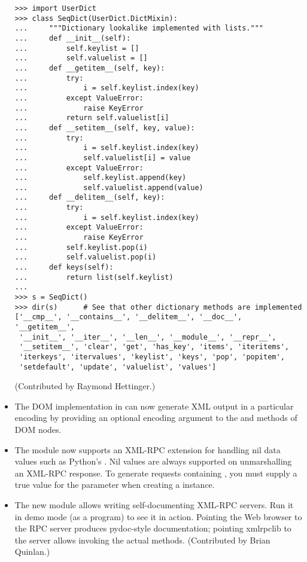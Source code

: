 \documentclass{howto}
\begin{document}
\begin{itemize}
\begin{verbatim}
>>> import UserDict
>>> class SeqDict(UserDict.DictMixin):
...     """Dictionary lookalike implemented with lists."""
...     def __init__(self):
...         self.keylist = []
...         self.valuelist = []
...     def __getitem__(self, key):
...         try:
...             i = self.keylist.index(key)
...         except ValueError:
...             raise KeyError
...         return self.valuelist[i]
...     def __setitem__(self, key, value):
...         try:
...             i = self.keylist.index(key)
...             self.valuelist[i] = value
...         except ValueError:
...             self.keylist.append(key)
...             self.valuelist.append(value)
...     def __delitem__(self, key):
...         try:
...             i = self.keylist.index(key)
...         except ValueError:
...             raise KeyError
...         self.keylist.pop(i)
...         self.valuelist.pop(i)
...     def keys(self):
...         return list(self.keylist)
... 
>>> s = SeqDict()
>>> dir(s)      # See that other dictionary methods are implemented
['__cmp__', '__contains__', '__delitem__', '__doc__', '__getitem__',
 '__init__', '__iter__', '__len__', '__module__', '__repr__',
 '__setitem__', 'clear', 'get', 'has_key', 'items', 'iteritems',
 'iterkeys', 'itervalues', 'keylist', 'keys', 'pop', 'popitem',
 'setdefault', 'update', 'valuelist', 'values']
\end{verbatim}

(Contributed by Raymond Hettinger.)

\item The DOM implementation
in  can now generate XML output in a
particular encoding by providing an optional encoding argument to
the  and  methods of DOM nodes.

\item The  module now supports an XML-RPC extension
for handling nil data values such as Python's .  Nil values
are always supported on unmarshalling an XML-RPC response.  To
generate requests containing , you must supply a true value
for the  parameter when creating a 
instance.

\item The new  module allows writing
self-documenting XML-RPC servers. Run it in demo mode (as a program)
to see it in action.   Pointing the Web browser to the RPC server
produces pydoc-style documentation; pointing xmlrpclib to the
server allows invoking the actual methods.
(Contributed by Brian Quinlan.)


\end{itemize}
\end{document}
